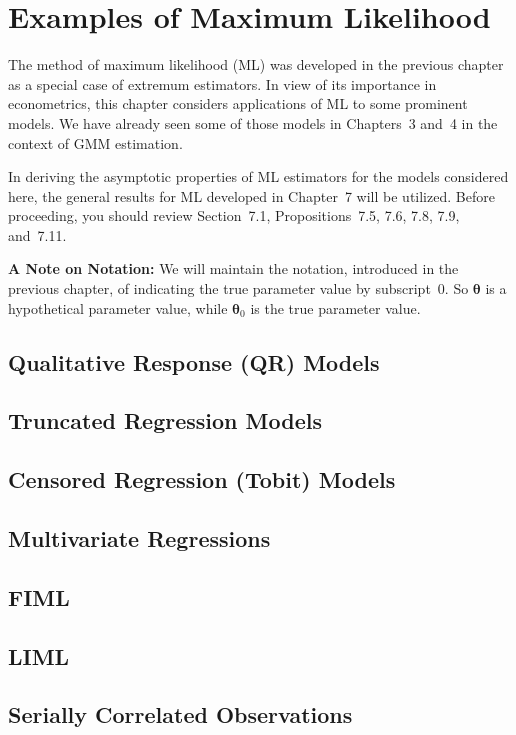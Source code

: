 
\chapter{Examples of Maximum Likelihood}
\label{ch:ml-examples}

The method of maximum likelihood (ML) was developed in the previous chapter as a
special case of extremum estimators. In view of its importance in econometrics, this
chapter considers applications of ML to some prominent models. We have already
seen some of those models in Chapters~3 and~4 in the context of GMM estimation.

In deriving the asymptotic properties of ML estimators for the models considered
here, the general results for ML developed in Chapter~7 will be utilized. Before
proceeding, you should review Section~7.1, Propositions~7.5, 7.6, 7.8, 7.9, and~7.11.

\medskip
\noindent\textbf{A Note on Notation:}\quad
We will maintain the notation, introduced in the previous
chapter, of indicating the true parameter value by subscript~0. So $\boldsymbol{\theta}$ is a hypothetical
parameter value, while $\boldsymbol{\theta}_0$ is the true parameter value.

\bigskip

\section{Qualitative Response (QR) Models}
\label{sec:8.1}


\section{Truncated Regression Models}
\label{sec:8.2}


\section{Censored Regression (Tobit) Models}
\label{sec:8.3}


\section{Multivariate Regressions}
\label{sec:8.4}


\section{FIML}
\label{sec:8.5}


\section{LIML}
\label{sec:8.6}


\section{Serially Correlated Observations}
\label{sec:8.7}




